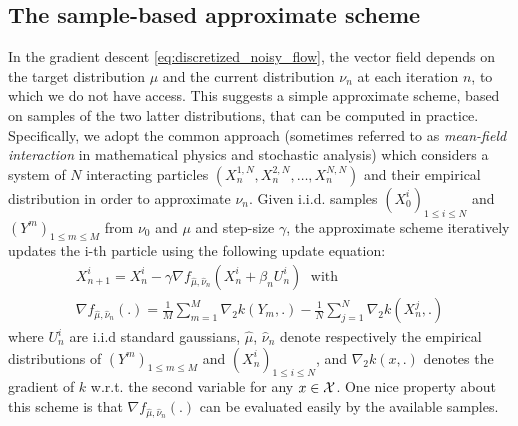 
\subsection{The sample-based approximate scheme}\label{sec:sample_based}

In the gradient descent \eqref{eq:discretized_noisy_flow}, the vector field depends on the target distribution $\mu$ and the current distribution $\nu_n$ at each iteration $n$, to which we do not have access. This suggests a simple approximate scheme, based on samples of the two latter distributions, that can be computed in practice. Specifically, we adopt the common approach (sometimes referred to as \textit{mean-field interaction} in mathematical physics and stochastic analysis) which considers a system of $N$ interacting particles $(X_n^{1,N}, X_n^{2,N}, \dots, X_n^{N,N})$ and their empirical distribution in order to approximate $\nu_n$. 
Given i.i.d. samples $(X^i_0)_{1\leq i\leq N}$ and $(Y^{m})_{1\leq m\leq M}$ from $\nu_0$ and $\mu$ and step-size $\gamma$, the approximate scheme iteratively updates the i-th particle using the following update equation: 
\begin{multline}\label{eq:euler_maruyama}
X_{n+1}^{i} = X_n^i -\gamma \nabla f_{\hat{\mu},\hat{\nu}_n}(X_n^i+\beta_n U_n^i)\; \text{ with }\\ \nabla f_{\hat{\mu},\hat{\nu}_n}(.) = \frac{1}{M}\sum\limits_{m=1}^M \nabla_2 k(Y_m,.)-\frac{1}{N}\sum\limits_{j=1}^N \nabla_2 k(X_n^j,.)
\end{multline}
where $U_{n}^{i}$ are i.i.d standard gaussians, $\hat{\mu}$, $\hat{\nu}_n$ denote respectively the empirical distributions of $(Y^{m})_{1\leq m\leq M}$ and $(X^i_n)_{1\leq i\leq N}$, and $\nabla_2k(x,.)$ denotes the gradient of $k$ w.r.t. the second variable for any $x \in {{\mathcal X}}$. One nice property about this scheme is that $\nabla f_{\hat{\mu},\hat{\nu}_n}(.)$ can be evaluated easily by the available samples.
